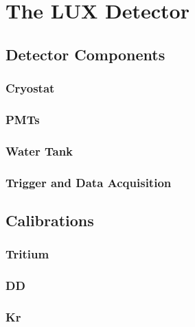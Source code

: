 \chapter{The LUX Detector}

\label{ch:LUX} %

\section{Detector Components}
\subsection{Cryostat}
\subsection{PMTs}
\subsection{Water Tank}
\subsection{Trigger and Data Acquisition}

\section{Calibrations}
\subsection{Tritium}
\subsection{DD}
\subsection{Kr}





